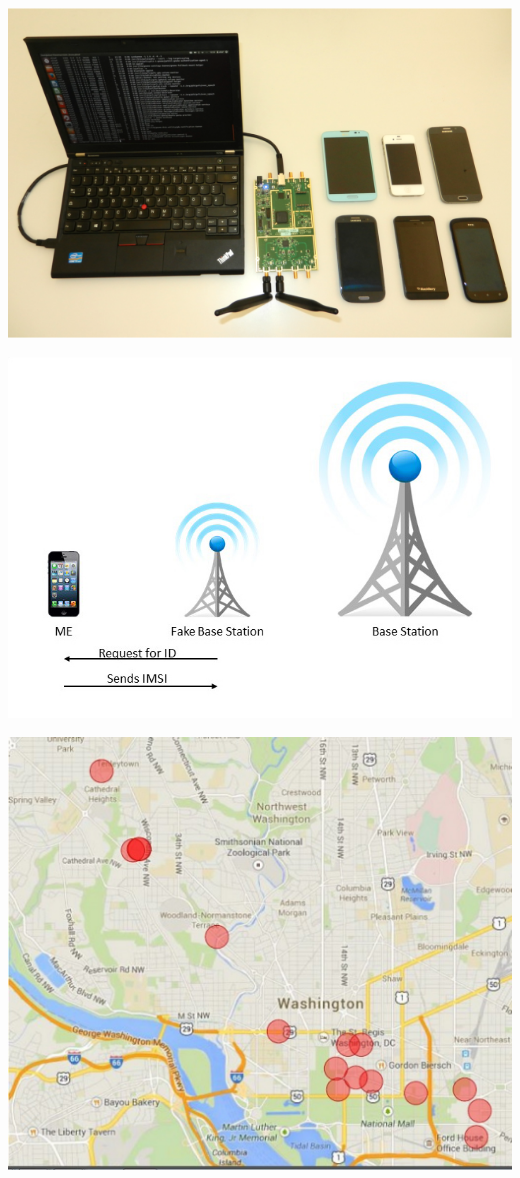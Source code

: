 \documentclass[portrait,a0]{a0poster}
\begin{document}
\begin{multicols}{2}
\begin{center}
\begin{minipage}[t]{0.3\linewidth} %
\vspace{0pt} %
\includegraphics[height=0.6\linewidth]{imsicatcher}
\hspace{300pt}
\end{minipage} 
\begin{minipage}[t]{0.33\linewidth} %
\vspace{0pt} %
\includegraphics[height=0.6\linewidth]{imsicatcher1}
\hspace{0pt}
\end{minipage} 
\begin{minipage}[t]{0.3\linewidth} %
\vspace{0pt} %
\includegraphics[width=0.6\linewidth]{mapnatsec}

\end{minipage}
\end{center}
\end{multicols}
\end{document}
